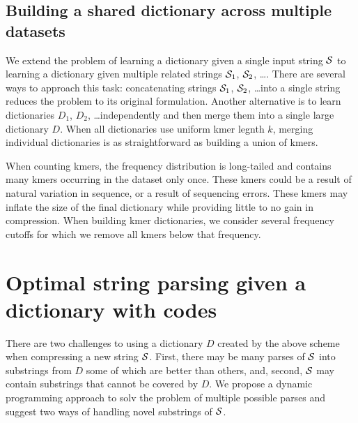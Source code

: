 \documentclass[12pt]{cmuthesis}
\begin{document}
  \subsection{Building a shared dictionary across multiple datasets}

  We extend the problem of learning a dictionary given a single input string $\mathcal{S}$ to learning a dictionary given multiple related strings $\mathcal{S}_1$, $\mathcal{S}_2$, \ldots. There are several ways to approach this task: concatenating strings $\mathcal{S}_1$, $\mathcal{S}_2$, \ldots into a single string reduces the problem to its original formulation. Another alternative is to learn dictionaries $D_1$, $D_2$, \ldots independently and then merge them into a single large dictionary $D$. When all dictionaries use uniform kmer legnth $k$, merging individual dictionaries is as straightforward as building a union of kmers. 

  When counting kmers, the frequency distribution is long-tailed and contains many kmers occurring in the dataset only once. These kmers could be a result of natural variation in sequence, or a result of sequencing errors.  These kmers may inflate the size of the final dictionary while providing little to no gain in compression. When building kmer dictionaries, we consider several frequency cutoffs for which we remove all kmers below that frequency.




\section{Optimal string parsing given a dictionary with codes}

  \newcommand{\esc}{\texttt{ESC}\xspace}
  \newcommand{\escremap}{\texttt{ESCR}\xspace}


  There are two challenges to using a dictionary $D$ created by the above scheme when compressing a new string $\mathcal{S}$. First, there may be many parses of $\mathcal{S}$ into substrings from $D$ some of which are better than others, and, second, $\mathcal{S}$ may contain substrings that cannot be covered by $D$. We propose a dynamic programming approach to solv the problem of multiple possible parses and suggest two ways of handling novel substrings of $\mathcal{S}$.
\end{document}
